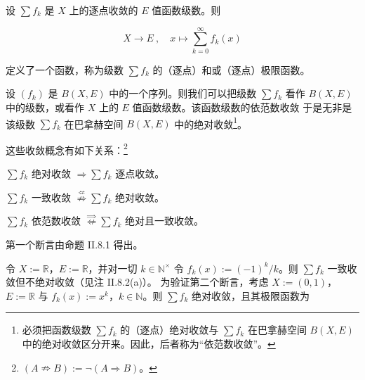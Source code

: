 \begin{remark}

\begin{items}
\item

设 $\sum f_k$ 是 $ X $ 上的逐点收敛的 $ E $ 值函数级数。则

\[
X\to E~,\quad x\mapsto\sum_{k=0}^{\infty}f_{k}(x)
\]

定义了一个函数，称为级数 $\sum f_k$ 的（逐点）和或（逐点）极限函数。

\item

设 $ (f_k) $ 是 $ B(X, E) $ 中的一个序列。则我们可以把级数 $\sum f_k$ 看作 $ B(X, E) $ 中的级数，或看作 $ X $ 上的 $ E $ 值函数级数。该函数级数的依范数收敛
于是无非是该级数 $\sum f_k$ 在巴拿赫空间 $ B(X, E) $ 中的绝对收敛\footnote{必须把函数级数 $ \sum f_k $ 的（逐点）绝对收敛与 $ \sum f_k $ 在巴拿赫空间 $ B(X, E) $ 中的绝对收敛区分开来。因此，后者称为“依范数收敛”。}。

\item

这些收敛概念有如下关系：\footnote{$ (A \nRightarrow B) := \neg(A \Rightarrow B) $。}

\end{items}

\begin{subitems}
\item

$ \sum f_k $ 绝对收敛 $ \Rightarrow \sum f_k $ 逐点收敛。

\item

$ \sum f_k $ 一致收敛 $ \overset{\not\Leftarrow}{\nRightarrow} \sum f_k $ 绝对收敛。

\item

$ \sum f_k $ 依范数收敛 $ \overset{\Rightarrow}{\not\Leftarrow} \sum f_k $ 绝对且一致收敛。

\proofhead
第一个断言由命题 II.8.1 得出。
\end{subitems}

\begin{subitems}
\item[（ii）]

令 $X := \mathbb{R}$，$E := \mathbb{R}$，并对一切 $k \in \mathbb{N}^\times$ 令 $f_k(x) := (-1)^k/k$。则 $\sum f_k$ 一致收敛但不绝对收敛（见注 II.8.2(a)）。
为验证第二个断言，考虑 $ X := (0,1) $，$ E := \mathbb{R} $ 与 $ f_k(x) := x^k $，$ k \in \mathbb{N} $。则 $\sum f_k$ 绝对收敛，且其极限函数为


\end{subitems}
\end{remark}
